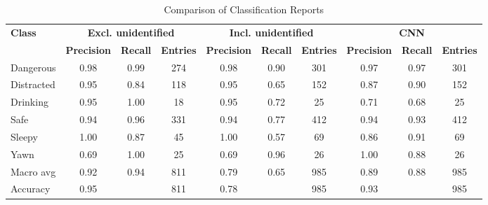 \documentclass{article}
\begin{document}
\begin{table}[htbp]
    \centering
    \caption{Comparison of Classification Reports}
    \vspace{3pt}
    \label{tab:classification_reports}
    \begin{adjustbox}{max width=\textwidth}
    \begin{tabular}{l|cc|c|cc|c|cc|c}
        \toprule
        \textbf{Class} & \multicolumn{3}{c|}{\textbf{Excl. unidentified}} & \multicolumn{3}{c|}{\textbf{Incl. unidentified}} & \multicolumn{3}{c}{\textbf{CNN}} \\
        \cmidrule{2-10}
         & \textbf{Precision} & \textbf{Recall} & \textbf{Entries} & \textbf{Precision} & \textbf{Recall} & \textbf{Entries} & \textbf{Precision} & \textbf{Recall} & \textbf{Entries} \\
        \midrule
        Dangerous & 0.98 & 0.99 & 274 & 0.98 & 0.90 & 301 & 0.97 & 0.97 & 301 \\
        Distracted & 0.95 & 0.84 & 118 & 0.95 & 0.65 & 152 & 0.87 & 0.90 & 152 \\
        Drinking & 0.95 & 1.00 & 18 & 0.95 & 0.72 & 25 & 0.71 & 0.68 & 25 \\
        Safe & 0.94 & 0.96 & 331 & 0.94 & 0.77 & 412 & 0.94 & 0.93 & 412 \\
        Sleepy & 1.00 & 0.87 & 45 & 1.00 & 0.57 & 69 & 0.86 & 0.91 & 69 \\
        Yawn & 0.69 & 1.00 & 25 & 0.69 & 0.96 & 26 & 1.00 & 0.88 & 26 \\
        \midrule
        Macro avg & 0.92 & 0.94 & 811 & 0.79 & 0.65 & 985 & 0.89 & 0.88 & 985 \\
        Accuracy & 0.95 & \phantom{0} & 811 & 0.78 & \phantom{0} & 985 & 0.93 & \phantom{0} & 985 \\
        \bottomrule
    \end{tabular}
    \end{adjustbox}
\end{table}
\end{document}

